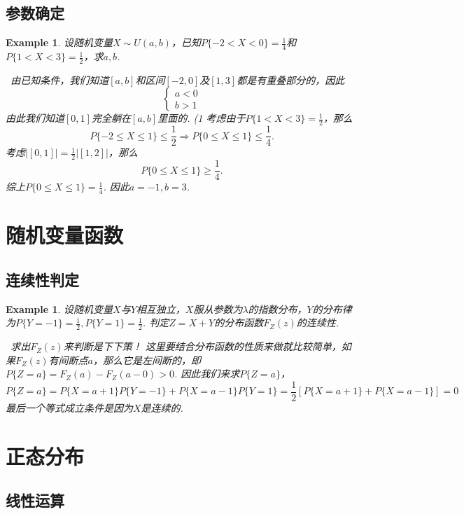 \documentclass{article}
\newtheorem{example}[theorem]{Example}
\newcommand{\hints}{{\color{blue} \text{hints}}}
\begin{document}
\subsection{参数确定}

\begin{example}
\rm 设随机变量$X \sim U(a,b)$，已知$P\{-2< X < 0\} = \frac{1}{4}$和$P\{1<X<3\} = \frac{1}{2}$，求$a,b$. 

\hints\ 由已知条件，我们知道$[a,b]$和区间$[-2,0]$及$[1,3]$都是有重叠部分的，因此
$$
\left\{
\begin{array}{ll}
a < 0 \\
b > 1  
\end{array} \right.
$$ 
由此我们知道$[0,1]$完全躺在$[a,b]$里面的. (1 考虑由于$P\{1< X < 3\} =\frac{1}{2}$，那么
$$
P\{-2 \leq X \leq 1\} \leq \frac{1}{2}  \Rightarrow  P\{0 \leq X \leq 1\} \leq \frac{1}{4}.
$$
考虑$|[0,1]| = \frac{1}{2}|[1,2]|$，那么
$$
P\{0 \leq X \leq 1\} \geq \frac{1}{4}. 
$$
综上$P\{0 \leq X \leq 1 \} = \frac{1}{4}$. 因此$a = -1, b=3$. 
\end{example}


\section{随机变量函数}

\subsection{连续性判定}

\begin{example}
\rm 设随机变量$X$与$Y$相互独立，$X$服从参数为$\lambda$的指数分布，$Y$的分布律为$P\{Y=-1\}=\frac{1}{2},P\{Y=1\}=\frac{1}{2}$. 判定$Z=X+Y$的分布函数$F_Z(z)$的连续性.

\hints\ 求出$F_Z(z)$来判断是下下策！ 这里要结合分布函数的性质来做就比较简单，如果$F_Z(z)$有间断点$a$，那么它是左间断的，即$P\{Z=a\} = F_Z(a) - F_Z(a-0) > 0$. 因此我们来求$P\{Z=a\}$，
$$
P\{Z=a\} = P\{X = a+1\}P\{Y = -1\} + P\{X = a-1\}P\{Y = 1\} = \frac{1}{2}\left[ P\{X = a+1\} + P\{X = a-1\} \right] = 0    
$$
最后一个等式成立条件是因为$X$是连续的. 
\end{example}

\newpage
\section{正态分布}


\subsection{线性运算}
\end{document}

